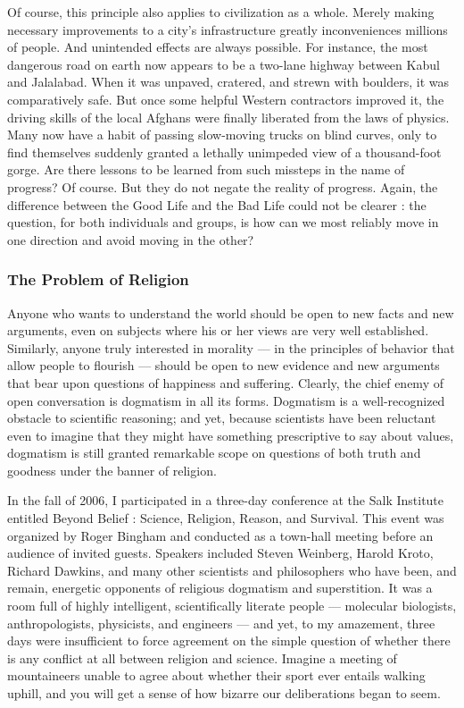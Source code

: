 \documentclass[a4paper,14pt]{extbook}
\begin{document}
Of course, this principle also applies to civilization as a whole.
Merely making necessary improvements to a city's infrastructure greatly inconveniences millions of people.
And unintended effects are always possible.
For instance, the most dangerous road on earth now appears to be a two-lane highway between Kabul and Jalalabad.
When it was unpaved, cratered, and strewn with boulders, it was comparatively safe.
But once some helpful Western contractors improved it, the driving skills of the local Afghans were finally liberated from the laws of physics.
Many now have a habit of passing slow-moving trucks on blind curves, only to find themselves suddenly granted a lethally unimpeded view of a thousand-foot gorge.
Are there lessons to be learned from such missteps in the name of progress?
Of course.
But they do not negate the reality of progress.
Again, the difference between the Good Life and the Bad Life could not be clearer :
the question, for both individuals and groups, is how can we most reliably move in one direction and avoid moving in the other?

\subsubsection{The Problem of Religion}

Anyone who wants to understand the world should be open to new facts and new arguments, even on subjects where his or her views are very well established.
Similarly, anyone truly interested in morality --- in the principles of behavior that allow people to flourish --- should be open to new evidence and new arguments that bear upon questions of happiness and suffering.
Clearly, the chief enemy of open conversation is dogmatism in all its forms.
Dogmatism is a well-recognized obstacle to scientific reasoning;
and yet, because scientists have been reluctant even to imagine that they might have something prescriptive to say about values, dogmatism is still granted remarkable scope on questions of both truth and goodness under the banner of religion.

In the fall of 2006, I participated in a three-day conference at the Salk Institute entitled Beyond Belief : Science, Religion, Reason, and Survival.
This event was organized by Roger Bingham and conducted as a town-hall meeting before an audience of invited guests.
Speakers included Steven Weinberg, Harold Kroto, Richard Dawkins, and many other scientists and philosophers who have been, and remain, energetic opponents of religious dogmatism and superstition.
It was a room full of highly intelligent, scientifically literate people --- molecular biologists, anthropologists, physicists, and engineers --- and yet, to my amazement, three days were insufficient to force agreement on the simple question of whether there is any conflict at all between religion and science.
Imagine a meeting of mountaineers unable to agree about whether their sport ever entails walking uphill, and you will get a sense of how bizarre our deliberations began to seem.
\end{document}
